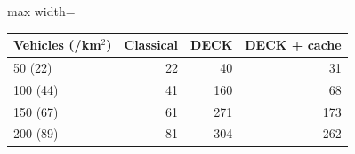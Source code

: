 \begin{adjustbox}{max width=\linewidth}
\begin{tabular}{lrrr}
\toprule
Vehicles (/km$^2$) & Classical & DECK & DECK + cache \\
\midrule
50 (22) & 22 & 40 & 31 \\
100 (44) & 41 & 160 & 68 \\
150 (67) & 61 & 271 & 173 \\
200 (89) & 81 & 304 & 262 \\
\bottomrule
\end{tabular}
\end{adjustbox}
\par{}
